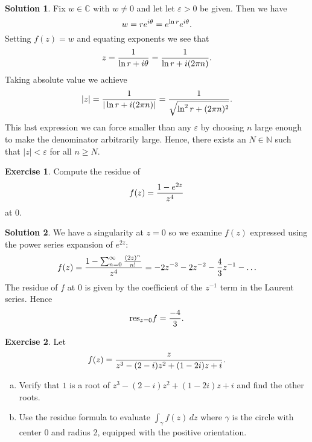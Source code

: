 \documentclass[a4paper, 10pt]{amsart}
\theoremstyle{definition}
\newtheorem{exrc}{Exercise}
\newtheorem*{sltn}{Solution}
\newcommand{\res}[2]{\mathrm{res}_{#1}#2}
\begin{document}
\begin{sltn}
  Fix $w \in \mathbb{C}$ with $w \neq 0$ and let let $\varepsilon > 0$ be given.
  Then we have
  \begin{equation}
    \notag
    w = re^{i\theta} = e^{\ln r} e^{i\theta}.
  \end{equation}
  Setting $f(z) = w$ and equating exponents we see that
  \begin{equation}
    \notag
    z = \frac{1}{\ln r + i\theta} = \frac{1}{\ln r + i(2\pi n)}.
  \end{equation}
  Taking absolute value we achieve
  \begin{equation}
    \notag
    |z| = \frac{1}{|\ln r + i(2\pi n)|} = \frac{1}{\sqrt{\ln^2 r + (2\pi n)^2}}.
  \end{equation}
  This last expression we can force smaller than any $\varepsilon$ by choosing
  $n$ large enough to make the denominator arbitrarily large. Hence, there
  exists an $N \in \mathbb{N}$ such that $|z| < \varepsilon$ for all $n \geq
  N$.
\end{sltn}
\begin{exrc}
  Compute the residue of
    \begin{equation}
      \notag
      f(z) = \frac{1- e^{2z}}{z^4}
    \end{equation}
    at 0.
\end{exrc}
\begin{sltn}
  We have a singularity at $z = 0$ so we examine $f(z)$ expressed using the power series expansion of $e^{2z}$:
  \begin{equation}
    \notag
    f(z) = \frac{1 - \sum^{\infty}_{n=0}\frac{(2z)^n}{n!}}{z^4} = -2z^{-3} - 2z^{-2} - \frac{4}{3}z^{-1} - \ldots
  \end{equation}
  The residue of $f$ at 0 is given by the coefficient of the $z^{-1}$ term in
  the Laurent series. Hence
  \begin{equation}
    \notag
    \res{z=0}{f} = \frac{-4}{3}.
  \end{equation}
\end{sltn}
\begin{exrc}
  Let
  \begin{equation}
    \notag
    f(z) = \frac{z}{z^3 - (2 - i)z^2 + (1-2i)z + i}.
  \end{equation}
  \begin{enumerate}[a)]
    \item Verify that $1$ is a root of $z^3 - (2-i)z^2 + (1 - 2i)z + i$ and
    find the other roots.  \item Use the residue formula to evaluate
      $\int_\gamma f(z) \, dz$ where $\gamma$ is the circle with center 0 and
      radius 2, equipped with the positive orientation.
  \end{enumerate}
\end{exrc}
\end{document}
